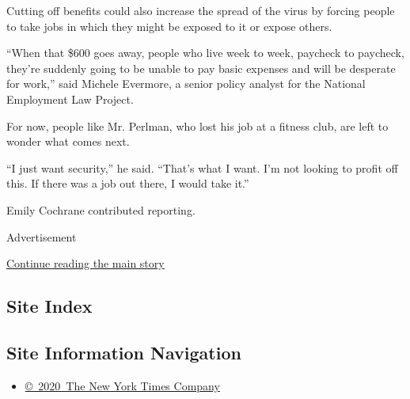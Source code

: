 Cutting off benefits could also increase the spread of the virus by
forcing people to take jobs in which they might be exposed to it or
expose others.

``When that \$600 goes away, people who live week to week, paycheck to
paycheck, they're suddenly going to be unable to pay basic expenses and
will be desperate for work,'' said Michele Evermore, a senior policy
analyst for the National Employment Law Project.

For now, people like Mr. Perlman, who lost his job at a fitness club,
are left to wonder what comes next.

``I just want security,'' he said. ``That's what I want. I'm not looking
to profit off this. If there was a job out there, I would take it.''

Emily Cochrane contributed reporting.

Advertisement

\protect\hyperlink{after-bottom}{Continue reading the main story}

\hypertarget{site-index}{%
\subsection{Site Index}\label{site-index}}

\hypertarget{site-information-navigation}{%
\subsection{Site Information
Navigation}\label{site-information-navigation}}

\begin{itemize}
\tightlist
\item
  \href{https://help.nytimes.com/hc/en-us/articles/115014792127-Copyright-notice}{©~2020~The
  New York Times Company}
\end{itemize}

